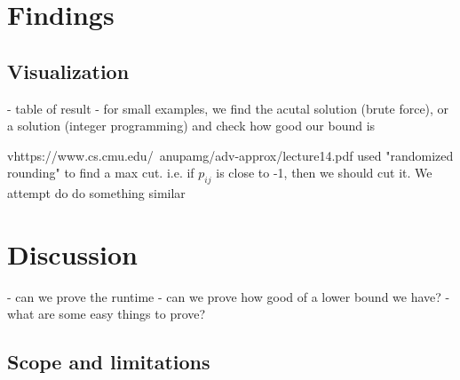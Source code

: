 \documentclass{article}
\begin{document}
\section{Findings}
\subsection{Visualization}
- table of result
- for small examples, we find the acutal solution (brute force), or a solution (integer programming) and check how 
good our bound is

vhttps://www.cs.cmu.edu/~anupamg/adv-approx/lecture14.pdf used "randomized rounding" to find a max cut.
i.e. if $p_{ij}$ is close to -1, then we should cut it. We attempt do do something similar

\section{Discussion}


- can we prove the runtime
- can we prove how good of a lower bound we have?
- what are some easy things to prove?

\subsection{Scope and limitations}
\end{document}
